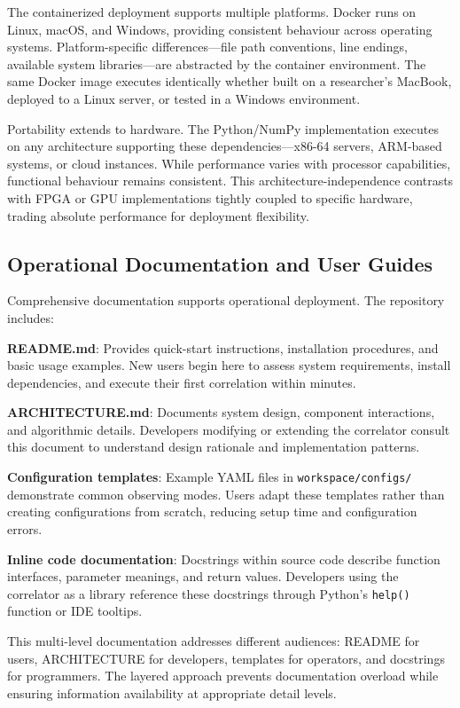 
The containerized deployment supports multiple platforms. Docker runs on Linux, macOS, and Windows, providing consistent behaviour across operating systems. Platform-specific differences—file path conventions, line endings, available system libraries—are abstracted by the container environment. The same Docker image executes identically whether built on a researcher's MacBook, deployed to a Linux server, or tested in a Windows environment.

Portability extends to hardware. The Python/NumPy implementation executes on any architecture supporting these dependencies—x86-64 servers, ARM-based systems, or cloud instances. While performance varies with processor capabilities, functional behaviour remains consistent. This architecture-independence contrasts with FPGA or GPU implementations tightly coupled to specific hardware, trading absolute performance for deployment flexibility.

\subsection{Operational Documentation and User Guides}

Comprehensive documentation supports operational deployment. The repository includes:

\textbf{README.md}: Provides quick-start instructions, installation procedures, and basic usage examples. New users begin here to assess system requirements, install dependencies, and execute their first correlation within minutes.

\textbf{ARCHITECTURE.md}: Documents system design, component interactions, and algorithmic details. Developers modifying or extending the correlator consult this document to understand design rationale and implementation patterns.

\textbf{Configuration templates}: Example YAML files in \texttt{workspace/configs/} demonstrate common observing modes. Users adapt these templates rather than creating configurations from scratch, reducing setup time and configuration errors.

\textbf{Inline code documentation}: Docstrings within source code describe function interfaces, parameter meanings, and return values. Developers using the correlator as a library reference these docstrings through Python's \texttt{help()} function or IDE tooltips.

This multi-level documentation addresses different audiences: README for users, ARCHITECTURE for developers, templates for operators, and docstrings for programmers. The layered approach prevents documentation overload while ensuring information availability at appropriate detail levels.


